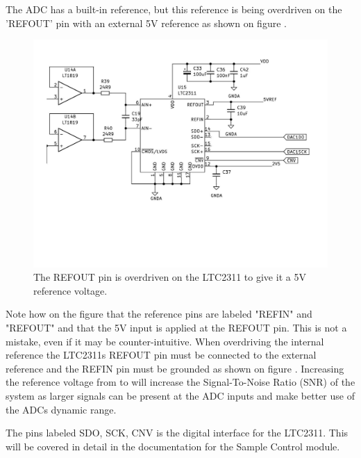 The ADC has a built-in  reference, but this reference is being overdriven on the 'REFOUT' pin with an external 5V reference as shown on figure .

\begin{figure}[H]
    \centering
    \includegraphics[clip, trim=0 150 0 0, width=1\textwidth]{Sections/7_SystemDesign/Figures/7_1_2_ADC5V.pdf}
    \caption{The REFOUT pin is overdriven on the LTC2311 to give it a 5V reference voltage.}
    \label{fig_7_1_2_ADC5VREF}
\end{figure}

Note how on the figure that the reference pins are labeled "REFIN" and "REFOUT" and that the 5V input is applied at the REFOUT pin. This is not a mistake, even if it may be counter-intuitive. When overdriving the internal reference the LTC2311s REFOUT pin must be connected to the external reference and the REFIN pin must be grounded as shown on figure . Increasing the reference voltage from  to  will increase the Signal-To-Noise Ratio (SNR) of the system as larger signals can be present at the ADC inputs and make better use of the ADCs dynamic range.

The pins labeled SDO, SCK, CNV is the digital interface for the LTC2311. This will be covered in detail in the documentation for the Sample Control module.
